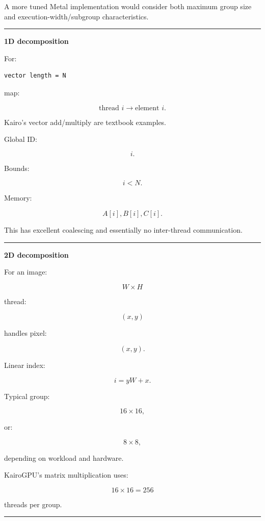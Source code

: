 A more tuned Metal implementation would consider both maximum group size and execution-width/subgroup characteristics.

\begin{center}\rule{0.5\linewidth}{0.5pt}\end{center}

\textbf{1D decomposition}

For:

\protect{}\label{zugmms}%
\begin{verbatim}
vector length = N
\end{verbatim}

map:

\[
\boxed{
\text{thread }i
\rightarrow
\text{element }i.
}
\]

Kairo's vector add/multiply are textbook examples.

Global ID:

\[
i.
\]

Bounds:

\[
i<N.
\]

Memory:

\[
A[i],B[i],C[i].
\]

This has excellent coalescing and essentially no inter-thread communication.

\begin{center}\rule{0.5\linewidth}{0.5pt}\end{center}

\textbf{2D decomposition}

For an image:

\[
W\times H
\]

thread:

\[
(x,y)
\]

handles pixel:

\[
(x,y).
\]

Linear index:

\[
\boxed{
i=yW+x.
}
\]

Typical group:

\[
16\times16,
\]

or:

\[
8\times8,
\]

depending on workload and hardware.

KairoGPU's matrix multiplication uses:

\[
16\times16=256
\]

threads per group.

\begin{center}\rule{0.5\linewidth}{0.5pt}\end{center}

